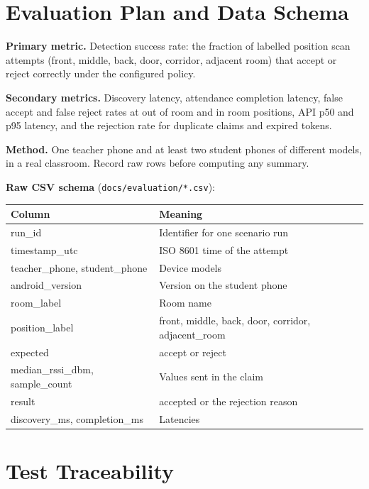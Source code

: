 \hypertarget{evaluation-plan-and-data-schema}{%
\section{Evaluation Plan and Data Schema}\label{evaluation-plan-and-data-schema}}

\textbf{Primary metric.} Detection success rate: the fraction of labelled position scan attempts (front, middle, back, door, corridor, adjacent room) that accept or reject correctly under the configured policy.

\textbf{Secondary metrics.} Discovery latency, attendance completion latency, false accept and false reject rates at out of room and in room positions, API p50 and p95 latency, and the rejection rate for duplicate claims and expired tokens.

\textbf{Method.} One teacher phone and at least two student phones of different models, in a real classroom. Record raw rows before computing any summary.

\textbf{Raw CSV schema} (\texttt{docs/evaluation/*.csv}):

\begin{longtable}[]{@{}ll@{}}
\toprule\noalign{}
Column & Meaning \\
\midrule\noalign{}
\endhead
\bottomrule\noalign{}
\endlastfoot
run\_id & Identifier for one scenario run \\
timestamp\_utc & ISO 8601 time of the attempt \\
teacher\_phone, student\_phone & Device models \\
android\_version & Version on the student phone \\
room\_label & Room name \\
position\_label & front, middle, back, door, corridor, adjacent\_room \\
expected & accept or reject \\
median\_rssi\_dbm, sample\_count & Values sent in the claim \\
result & accepted or the rejection reason \\
discovery\_ms, completion\_ms & Latencies \\
\end{longtable}

\hypertarget{test-traceability}{%
\section{Test Traceability}\label{test-traceability}}

